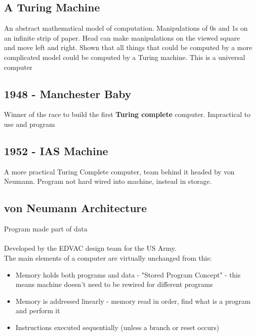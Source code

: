 \documentclass{article}[18pt]
\begin{document}
\subsection{A Turing Machine}
An abstract mathematical model of computation. Manipulations of 0s and 1s on an infinite strip of paper. Head can make manipulations on the viewed square and move left and right. Shown that all things that could be computed by a more complicated model could be computed by a Turing machine. This is a universal computer
\subsection{1948 - Manchester Baby}
Winner of the race to build the first \textbf{Turing complete} computer. Impractical to use and program
\subsection{1952 - IAS Machine}
A more practical Turing Complete computer, team behind it headed by von Neumann. Program not hard wired into machine, instead in storage.
\subsection{von Neumann Architecture}
Program made part of data\\
\\
Developed by the EDVAC design team for the US Army.\\
The main elements of a computer are virtually unchanged from this:
\begin{itemize}
\item Memory holds both programs and data - "Stored Program Concept" - this means machine doesn't need to be rewired for different programs
\item Memory is addressed linearly - memory read in order, find what is a program and perform it
\item Instructions executed sequentially (unless a branch or reset occurs)
\end{itemize}
\end{document}
